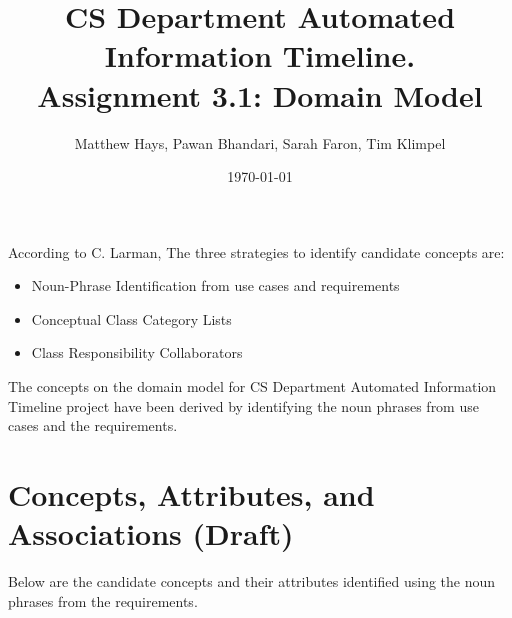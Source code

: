 \documentclass{article}
\title{CS Department Automated Information Timeline. \\ Assignment 3.1: Domain Model}
\date{\today}
\author{Matthew Hays, Pawan Bhandari, Sarah Faron, Tim Klimpel}
\begin{document}
\maketitle
\newpage
\tableofcontents
\listoffigures
\newpage

According to C. Larman, The three strategies to identify candidate concepts are:
\begin{itemize}
    \item Noun-Phrase Identification from use cases and requirements
    \item Conceptual Class Category Lists
    \item Class Responsibility Collaborators
\end{itemize}
The concepts on the domain model for CS Department Automated Information Timeline project have been derived by identifying the noun phrases from use cases and the requirements.

\section{Concepts, Attributes, and Associations (Draft)}
Below are the candidate concepts and their attributes identified using the noun phrases from the requirements.\\
\end{document}

